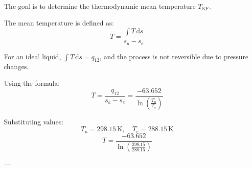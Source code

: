 The goal is to determine the thermodynamic mean temperature \( T_{\text{KF}} \).  

The mean temperature is defined as:  
\[
T = \frac{\int T \, \mathrm{d}s}{s_a - s_e}
\]  

For an ideal liquid, \( \int T \, \mathrm{d}s = q_{12} \), and the process is not reversible due to pressure changes.  

Using the formula:  
\[
T = \frac{q_{12}}{s_a - s_e} = \frac{-63.652}{\ln \left( \frac{T_a}{T_e} \right)}
\]  

Substituting values:  
\[
T_a = 298.15 \, \text{K}, \quad T_e = 288.15 \, \text{K}
\]  
\[
T = \frac{-63.652}{\ln \left( \frac{298.15}{288.15} \right)}
\]  

---